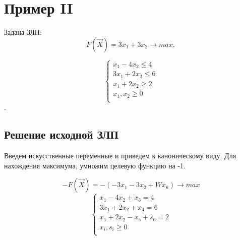 \section{Пример II}
\renewcommand{\labelenumi}{\arabic{enumi})}
Задана ЗЛП:
\begin{equation}
	F(\vec{X}) = 3x_1 + 3x_2 \to max,
\end{equation}

\begin{equation}
\begin{cases}
x_1 - 4x_2 \le 4 \\
3x_1 + 2x_2 \le 6 \\
x_1 + 2x_2 \ge 2 \\
x_1, x_2 \ge 0 \\
\end{cases}
\end{equation}.

\subsection{Решение исходной ЗЛП}
Введем искусственные переменные и приведем к каноническому виду.
Для нахождения максимума, умножим целевую функцию на -1.

$$-F(\vec{X}) = -(-3x_1-3x_2+Wx_6) \to max$$
\begin{equation}
\label{cannonical}
\begin{cases}
x_1-4x_2+x_3=4\\
3x_1+2x_2+x_4=6\\
x_1+2x_2-x_5+ s_6=2\\
x_i, s_i \ge 0 \\
\end{cases}
\end{equation}

